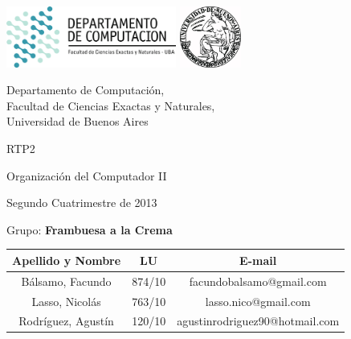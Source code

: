 \documentclass[a4paper,10pt,twoside]{article}
\begin{document}


\thispagestyle{caratula}

\begin{center}

\includegraphics[height=2cm]{DC.png} 
\hfill
\includegraphics[height=2cm]{UBA.jpg} 

\vspace{2cm}

Departamento de Computación,\\
Facultad de Ciencias Exactas y Naturales,\\
Universidad de Buenos Aires

\vspace{4cm}

\begin{Huge}
RTP2
\end{Huge}

\vspace{0.5cm}

\begin{Large}
Organización del Computador II
\end{Large}

\vspace{1cm}

Segundo Cuatrimestre de 2013

\vspace{4cm}

Grupo: \textbf{Frambuesa a la Crema}

\vspace{0.5cm}

\begin{tabular}{|c|c|c|}
\hline
Apellido y Nombre & LU & E-mail\\
\hline
B\'alsamo, Facundo		& 874/10 & facundobalsamo@gmail.com\\
Lasso, Nicol\'as 			& 763/10 & lasso.nico@gmail.com\\
Rodr\'iguez, Agust\'in	& 120/10 & agustinrodriguez90@hotmail.com\\
\hline
\end{tabular}

\end{center}
\end{document}
